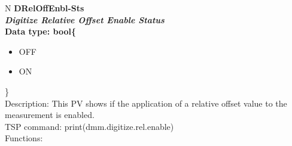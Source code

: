 \documentclass[openany]{article}
\begin{document}
		\begin{tabular}{N}
			\hline
			\bfseries DRelOffEnbl-Sts\label{pv:dreloffenbl-sts} \\ \hline
			\emph{Digitize Relative Offset Enable Status} \\
			Data type: bool\{\begin{itemize}[noitemsep]
				\small
				\item[] OFF
				\item[] ON
			\end{itemize}\} \\
			Description: This PV shows if the application of a relative offset value to the measurement is enabled. \\
			TSP command: print(dmm.digitize.rel.enable) \\
			Functions: \\
			\arrayrulecolor{\FuncTableBorderColor}

		\end{tabular}
\end{document}
